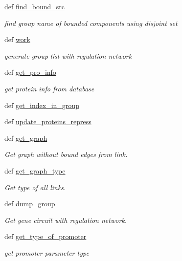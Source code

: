 \begin{DoxyCompactItemize}
def \hyperlink{namespaceweb_1_1group_ae65499baac8300b77c14b3b0346c0bc5}{find\-\_\-bound\-\_\-src}
\begin{DoxyCompactList}\small\item\em find group name of bounded components using disjoint set \end{DoxyCompactList}\item 
def \hyperlink{namespaceweb_1_1group_a8b2f16691c1fcd46dcaeb6caf126b83c}{work}
\begin{DoxyCompactList}\small\item\em generate group list with regulation network \end{DoxyCompactList}\item 
def \hyperlink{namespaceweb_1_1group_a9e785167826f7ef524a3bdccfc98455c}{get\-\_\-pro\-\_\-info}
\begin{DoxyCompactList}\small\item\em get protein info from database \end{DoxyCompactList}\item 
def \hyperlink{namespaceweb_1_1group_af7921feda2c18777bebf59ae4c532121}{get\-\_\-index\-\_\-in\-\_\-group}
\item 
def \hyperlink{namespaceweb_1_1group_a7ede79fa62936bbc6e821b1f0a75c570}{update\-\_\-proteins\-\_\-repress}
\item 
def \hyperlink{namespaceweb_1_1group_a93eb2d8483a9b3bed1b1b1033805955b}{get\-\_\-graph}
\begin{DoxyCompactList}\small\item\em Get graph without bound edges from link. \end{DoxyCompactList}\item 
def \hyperlink{namespaceweb_1_1group_aafb6d981189db7c6d6043abce37cc4e9}{get\-\_\-graph\-\_\-type}
\begin{DoxyCompactList}\small\item\em Get type of all links. \end{DoxyCompactList}\item 
def \hyperlink{namespaceweb_1_1group_aefc373ecaa83f866c9a8f59a8c33db7a}{dump\-\_\-group}
\begin{DoxyCompactList}\small\item\em Get gene circuit with regulation network. \end{DoxyCompactList}\item 
def \hyperlink{namespaceweb_1_1group_ae75c96cbf52ca98d07424f00b72e53eb}{get\-\_\-type\-\_\-of\-\_\-promoter}
\begin{DoxyCompactList}\small\item\em get promoter parameter type \end{DoxyCompactList}\item 

\end{DoxyCompactItemize}
